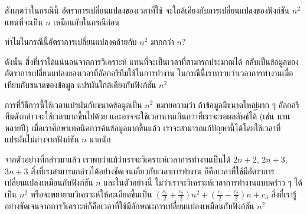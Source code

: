 สังเกต{\wbr}ว่า{\wbr}ใน{\wbr}กรณี{\wbr}นี้ อัตรา{\wbr}การ{\wbr}เปลี่ยนแปลง{\wbr}ของ{\wbr}เวลา{\wbr}ที่{\wbr}ใช้{\wbr}
จะ{\wbr}ใกล้เคียง{\wbr}กับ{\wbr}การ{\wbr}เปลี่ยนแปลง{\wbr}ของ{\wbr}ฟังก์ชัน $n^2$ แทน{\wbr}ที่{\wbr}จะ{\wbr}เป็น $n$ เหมือน{\wbr}กับ{\wbr}ใน{\wbr}กรณี{\wbr}ก่อน{\wbr}

\begin{quiz}{}
ทำไม{\wbr}ใน{\wbr}กรณี{\wbr}นี้{\wbr}อัตรา{\wbr}การ{\wbr}เปลี่ยนแปลง{\wbr}คล้าย{\wbr}กับ $n^2$ มาก{\wbr}กว่า $n$?
\end{quiz}

ดังนั้น สิ่ง{\wbr}ที่{\wbr}เรา{\wbr}ได้{\wbr}แน่นอน{\wbr}จาก{\wbr}การ{\wbr}วิเคราะห์ แทน{\wbr}ที่{\wbr}จะ{\wbr}เป็น{\wbr}เวลา{\wbr}ที่{\wbr}สามารถ{\wbr}ประมาณ{\wbr}ได้{\wbr}
กลับ{\wbr}เป็น{\wbr}ข้อมูล{\wbr}ของ{\wbr}อัตรา{\wbr}การ{\wbr}เปลี่ยนแปลง{\wbr}ของ{\wbr}เวลา{\wbr}ที่{\wbr}อัล{\wbr}กอ{\wbr}ริ{\wbr}ทึม{\wbr}ใช้{\wbr}ใน{\wbr}การ{\wbr}ทำงาน{\wbr}
ใน{\wbr}กรณี{\wbr}นี้{\wbr}เรา{\wbr}ทราบ{\wbr}ว่า{\wbr}เวลา{\wbr}การ{\wbr}ทำงาน{\wbr}เมื่อ{\wbr}เทียบ{\wbr}กับ{\wbr}ขนาด{\wbr}ของ{\wbr}ข้อมูล แปรผัน{\wbr}ใกล้เคียง{\wbr}กับ{\wbr}ฟังก์ชัน{\wbr}
$n^2$

การ{\wbr}ที่{\wbr}วิธีการ{\wbr}นี้{\wbr}ใช้เวลา{\wbr}แปรผัน{\wbr}กับ{\wbr}ขนาด{\wbr}ข้อมูล{\wbr}เป็น $n^2$ หมายความ{\wbr}ว่า ถ้า{\wbr}ข้อมูล{\wbr}มี{\wbr}ขนาด{\wbr}ใหญ่{\wbr}มาก{\wbr}
ๆ อัล{\wbr}กอ{\wbr}ริ{\wbr}ทึม{\wbr}ดังกล่าว{\wbr}จะ{\wbr}ใช้เวลา{\wbr}มาก{\wbr}ขึ้น{\wbr}ไป{\wbr}ด้วย{\wbr}
และ{\wbr}อาจ{\wbr}จะ{\wbr}ใช้เวลา{\wbr}นาน{\wbr}เกิน{\wbr}กว่า{\wbr}ที่{\wbr}เรา{\wbr}จะ{\wbr}รอ{\wbr}ผลลัพธ์{\wbr}ได้ (เช่น นาน{\wbr}หลาย{\wbr}ปี)
เมื่อ{\wbr}เรา{\wbr}ศึกษา{\wbr}เทคนิค{\wbr}การ{\wbr}ค้น{\wbr}ข้อมูล{\wbr}มาก{\wbr}ขึ้น{\wbr}แล้ว{\wbr}
เรา{\wbr}จะ{\wbr}สามารถ{\wbr}แก้{\wbr}ปัญหา{\wbr}นี้{\wbr}ได้{\wbr}โดย{\wbr}ใช้เวลา{\wbr}ที่{\wbr}แปรผัน{\wbr}ไม่{\wbr}ต่าง{\wbr}จาก{\wbr}ฟังก์ชัน $n$ มาก{\wbr}นัก{\wbr}

จาก{\wbr}ตัวอย่าง{\wbr}ที่{\wbr}กล่าว{\wbr}มา{\wbr}แล้ว เรา{\wbr}พบ{\wbr}ว่า{\wbr}แม้ว่า{\wbr}เรา{\wbr}จะ{\wbr}วิเคราะห์{\wbr}เวลา{\wbr}การ{\wbr}ทำงาน{\wbr}เป็น{\wbr}ได้ $2n+2$,
$2n+3$, $3n+3$ สิ่ง{\wbr}ที่{\wbr}เรา{\wbr}สามารถ{\wbr}กล่าว{\wbr}ได้{\wbr}อย่าง{\wbr}ชัดเจน{\wbr}เกี่ยวกับ{\wbr}เวลา{\wbr}การ{\wbr}ทำงาน{\wbr}
ก็{\wbr}คือ{\wbr}เวลา{\wbr}ที่{\wbr}ใช้{\wbr}มี{\wbr}อัตรา{\wbr}การ{\wbr}เปลี่ยนแปลง{\wbr}เหมือน{\wbr}กับ{\wbr}ฟังก์ชัน $n$ และ{\wbr}ใน{\wbr}ตัวอย่าง{\wbr}นี้{\wbr}
ไม่ว่า{\wbr}เรา{\wbr}จะ{\wbr}วิเคราะห์{\wbr}เวลา{\wbr}การ{\wbr}ทำงาน{\wbr}แบบ{\wbr}คร่าว ๆ ได้{\wbr}เป็น $n^2$
หรือ{\wbr}จะ{\wbr}พยายาม{\wbr}วิเคราะห์{\wbr}ให้{\wbr}ละเอียด{\wbr}ขึ้น{\wbr}เป็น $\left(\frac{c_1}{2} +
\frac{c_2}{2}\right)n^2 + \left(\frac{c_1}{2} - \frac{c_2}{2}\right)n
+ c_3$
สิ่ง{\wbr}ที่{\wbr}เรา{\wbr}รู้{\wbr}อย่าง{\wbr}ชัดเจน{\wbr}จาก{\wbr}การ{\wbr}วิเคราะห์{\wbr}ก็{\wbr}คือ{\wbr}เวลา{\wbr}ที่{\wbr}ใช้{\wbr}มี{\wbr}ลักษณะ{\wbr}การ{\wbr}เปลี่ยนแปลง{\wbr}เหมือน{\wbr}กับ{\wbr}ฟังก์ชัน{\wbr}
$n^2$

